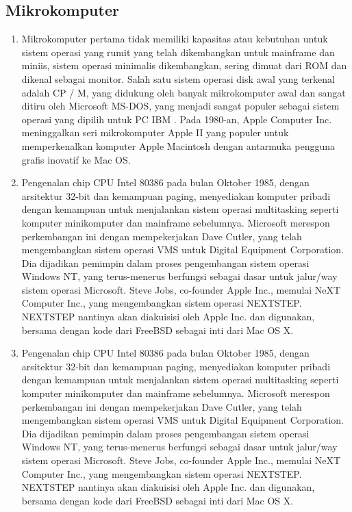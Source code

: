 \subsection{Mikrokomputer}
	\begin{enumerate}
		\item Mikrokomputer pertama tidak memiliki kapasitas atau kebutuhan untuk sistem operasi yang rumit yang telah dikembangkan untuk mainframe dan miniis, sistem operasi minimalis dikembangkan, sering dimuat dari ROM dan dikenal sebagai monitor. Salah satu sistem operasi disk awal yang terkenal adalah CP / M, yang didukung oleh banyak mikrokomputer awal dan sangat ditiru oleh Microsoft MS-DOS, yang menjadi sangat populer sebagai sistem operasi yang dipilih untuk PC IBM . Pada 1980-an, Apple Computer Inc.  meninggalkan seri mikrokomputer Apple II yang populer untuk memperkenalkan komputer Apple Macintosh dengan antarmuka pengguna grafis inovatif  ke Mac OS.

		\item Pengenalan chip CPU Intel 80386 pada bulan Oktober 1985,  dengan arsitektur 32-bit dan kemampuan paging, menyediakan komputer pribadi dengan kemampuan untuk menjalankan sistem operasi multitasking seperti komputer minikomputer dan mainframe sebelumnya. Microsoft merespon perkembangan ini dengan mempekerjakan Dave Cutler, yang telah mengembangkan sistem operasi VMS untuk Digital Equipment Corporation. Dia dijadikan pemimpin dalam proses  pengembangan sistem operasi Windows NT, yang terus-menerus berfungsi sebagai dasar untuk jalur/way sistem operasi Microsoft. Steve Jobs, co-founder Apple Inc., memulai NeXT Computer Inc., yang mengembangkan sistem operasi NEXTSTEP. NEXTSTEP nantinya akan diakuisisi oleh Apple Inc. dan digunakan, bersama dengan kode dari FreeBSD sebagai inti dari Mac OS X.

		\item Pengenalan chip CPU Intel 80386 pada bulan Oktober 1985,  dengan arsitektur 32-bit dan kemampuan paging, menyediakan komputer pribadi dengan kemampuan untuk menjalankan sistem operasi multitasking seperti komputer minikomputer dan mainframe sebelumnya. Microsoft merespon perkembangan ini dengan mempekerjakan Dave Cutler, yang telah mengembangkan sistem operasi VMS untuk Digital Equipment Corporation. Dia dijadikan pemimpin dalam proses  pengembangan sistem operasi Windows NT, yang terus-menerus berfungsi sebagai dasar untuk jalur/way sistem operasi Microsoft. Steve Jobs, co-founder Apple Inc., memulai NeXT Computer Inc., yang mengembangkan sistem operasi NEXTSTEP. NEXTSTEP nantinya akan diakuisisi oleh Apple Inc. dan digunakan, bersama dengan kode dari FreeBSD sebagai inti dari Mac OS X.


\end{enumerate}
